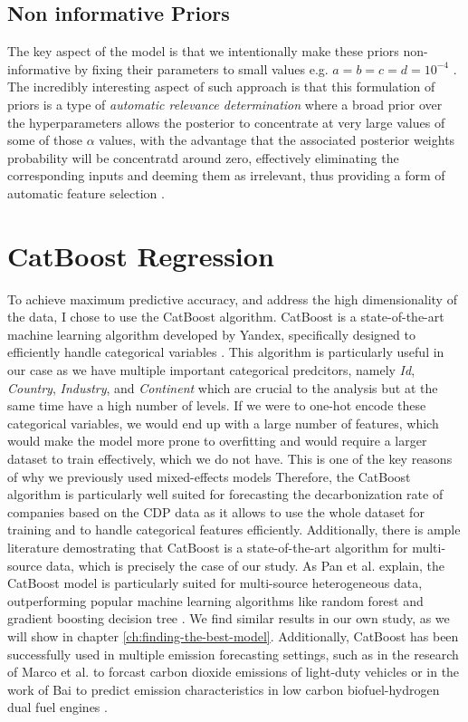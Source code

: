 \subsection{Non informative Priors}
The key aspect of the model is that we intentionally make these priors non-informative by fixing their parameters to small values e.g. $a = b = c = d = 10^{-4}$ \cite{tipping}. The incredibly interesting aspect of such approach is that this formulation of priors is a type of \textit{automatic relevance determination} \cite{MacKay1996} where a broad prior over the hyperparameters allows the posterior to concentrate at very large values of some of those $\alpha$ values, with the advantage that the associated posterior weights probability will be concentratd around zero, effectively eliminating the corresponding inputs and deeming them as irrelevant, thus providing a form of automatic feature selection \cite{tipping}. 


\section{CatBoost Regression}
To achieve maximum predictive accuracy, and address the high dimensionality of the data, I chose to use the CatBoost algorithm. CatBoost is a state-of-the-art machine learning algorithm developed by Yandex, specifically designed to efficiently handle categorical variables \cite{prokhorenkova2018catboost}. This algorithm is particularly useful in our case as we have multiple important categorical predcitors, namely \textit{Id}, \textit{Country}, \textit{Industry}, and \textit{Continent} which are crucial to the analysis but at the same time have a high number of levels. If we were to one-hot encode these categorical variables, we would end up with a large number of features, which would make the model more prone to overfitting and would require a larger dataset to train effectively, which we do not have. This is one of the key reasons of why we previously used mixed-effects models Therefore, the CatBoost algorithm is particularly well suited for forecasting the decarbonization rate of companies based on the CDP data as it allows to use the whole dataset for training and to handle categorical features efficiently. Additionally, there is ample literature demostrating that CatBoost is a state-of-the-art algorithm for multi-source data, which is precisely the case of our study. As Pan et al. explain, the CatBoost model is particularly suited for multi-source heterogeneous data, outperforming popular machine learning algorithms like random forest and gradient boosting decision tree \cite{Pan2020Data}. We find similar results in our own study, as we will show in chapter \ref{ch:finding-the-best-model}. Additionally, CatBoost has been successfully used in multiple emission forecasting  settings, such as in the research of Marco et al. to forcast carbon dioxide emissions of light-duty vehicles \cite{marco} or in the work of Bai to predict emission characteristics in low carbon biofuel-hydrogen dual fuel engines \cite{bai}.

